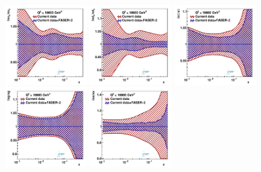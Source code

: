 \begin{figure}[t]
\centering
\includegraphics[width=0.32\textwidth]{plots/nuclear_fasernu2/statOnly_FASERv2_q2_10000_pdf_uV_ratio.pdf}
\includegraphics[width=0.32\textwidth]{plots/nuclear_fasernu2/statOnly_FASERv2_q2_10000_pdf_dV_ratio.pdf}
\includegraphics[width=0.32\textwidth]{plots/nuclear_fasernu2/statOnly_FASERv2_q2_10000_pdf_Sea_ratio.pdf}\\
\includegraphics[width=0.32\textwidth]{plots/nuclear_fasernu2/statOnly_FASERv2_q2_10000_pdf_g_ratio.pdf}
\includegraphics[width=0.32\textwidth]{plots/nuclear_fasernu2/statOnly_FASERv2_q2_10000_pdf_s_ratio.pdf}

\end{figure}
